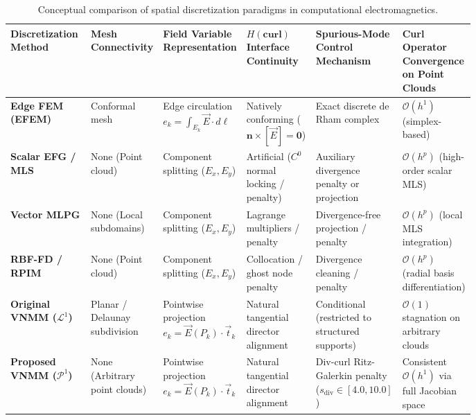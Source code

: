 \documentclass[preprint,12pt]{elsarticle}
\begin{document}
\begin{table}[!htbp]
\centering
\footnotesize
\setlength{\tabcolsep}{3pt}
\caption{Conceptual comparison of spatial discretization paradigms in computational electromagnetics.}
\label{tab:meshless_comparison}
\begin{tabularx}{\linewidth}{@{}
>{\raggedright\arraybackslash}p{0.18\linewidth}
>{\centering\arraybackslash}p{0.12\linewidth}
>{\centering\arraybackslash}p{0.15\linewidth}
>{\centering\arraybackslash}p{0.15\linewidth}
>{\centering\arraybackslash}p{0.18\linewidth}
>{\centering\arraybackslash}X
@{}}
\toprule
\textbf{Discretization Method} & 
\textbf{Mesh Connectivity} & 
\textbf{Field Variable Representation} & 
\textbf{$H(\mathbf{curl})$ Interface Continuity} & 
\textbf{Spurious-Mode Control Mechanism} & 
\textbf{Curl Operator Convergence on Point Clouds} \\
\midrule
\textbf{Edge FEM (EFEM)} \cite{nedelec1980mixed, monk2003finite} & 
Conformal mesh & 
Edge circulation $e_k = \int_{E_k} \vec{E} \cdot d\boldsymbol{\ell}$ & 
Natively conforming ($\mathbf{n} \times [\vec{E}] = \mathbf{0}$) & 
Exact discrete de Rham complex & 
$\mathcal{O}(h^1)$ (simplex-based) \\
\addlinespace
\textbf{Scalar EFG / MLS} \cite{belytschko1994element, cingoski1998element} & 
None (Point cloud) & 
Component splitting ($E_x, E_y$) & 
Artificial ($C^0$ normal locking / penalty) & 
Auxiliary divergence penalty or projection & 
$\mathcal{O}(h^p)$ (high-order scalar MLS) \\
\addlinespace
\textbf{Vector MLPG} \cite{atluri2002meshless, nicomedes2012meshless} & 
None (Local subdomains) & 
Component splitting ($E_x, E_y$) & 
Lagrange multipliers / penalty & 
Divergence-free projection / penalty & 
$\mathcal{O}(h^p)$ (local MLS integration) \\
\addlinespace
\textbf{RBF-FD / RPIM} \cite{liu2005introduction, slak2018refined} & 
None (Point cloud) & 
Component splitting ($E_x, E_y$) & 
Collocation / ghost node penalty & 
Divergence cleaning / penalty & 
$\mathcal{O}(h^p)$ (radial basis differentiation) \\
\addlinespace
\textbf{Original VNMM ($\mathcal{L}^1$)} \cite{ortiz2021nodal, ortiz2023tese} & 
Planar / Delaunay subdivision & 
Pointwise projection $e_k = \vec{E}(P_k) \cdot \vec{t}_k$ & 
Natural tangential director alignment & 
Conditional (restricted to structured supports) & 
$\mathcal{O}(1)$ stagnation on arbitrary clouds \\
\addlinespace
\textbf{Proposed VNMM ($\mathcal{P}^1$)} & 
None (Arbitrary point clouds) & 
Pointwise projection $e_k = \vec{E}(P_k) \cdot \vec{t}_k$ & 
Natural tangential director alignment & 
Div-curl Ritz-Galerkin penalty ($s_{\mathrm{div}} \in [4.0, 10.0]$) & 
Consistent $\mathcal{O}(h^1)$ via full Jacobian space \\
\bottomrule
\end{tabularx}
\end{table}
\end{document}
